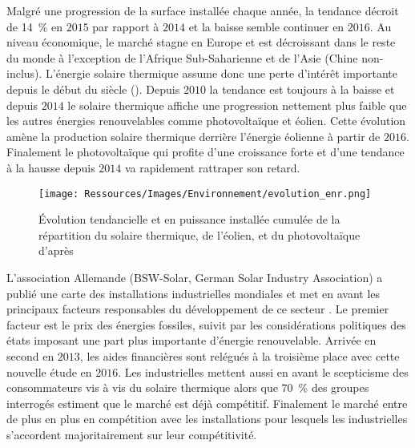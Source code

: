 Malgré une progression de la surface installée chaque année, la tendance décroit
de \SI{14}{\percent} en $2015$ par rapport à $2014$ et la baisse semble continuer en
$2016$. Au niveau économique, le marché stagne en Europe et est décroissant dans le reste
du monde à l’exception de l’Afrique Sub-Saharienne et de l’Asie (Chine non-inclus).
L’énergie solaire thermique assume donc une perte d’intérêt importante depuis le début du siècle
(). Depuis $2010$ la tendance est toujours à la baisse
et depuis $2014$ le solaire thermique affiche une progression nettement plus faible
que les autres énergies renouvelables comme photovoltaïque et éolien. Cette évolution
amène la production solaire thermique derrière l’énergie éolienne à partir de $2016$. Finalement
le photovoltaïque qui profite d’une croissance forte et d’une tendance à la hausse depuis $2014$
va rapidement rattraper son retard.

\begin{figure}
    \centering
    \texttt{[image: Ressources/Images/Environnement/evolution\_enr.png]}
    \caption{Évolution tendancielle et en puissance installée cumulée de la répartition
             du solaire thermique, de l’éolien, et du photovoltaïque d’après
             \textcite{Weiss2017}}
    \label{fig:tendances_enr}
\end{figure}

L’association Allemande (\textsf{BSW-Solar}, German Solar Industry Association)
a publié une carte des installations industrielles mondiales et met en avant les
principaux facteurs responsables du développement de ce secteur \parencite{Augsten2017}.
Le premier facteur est le prix des énergies fossiles, suivit par les considérations
politiques des états imposant une part plus importante d’énergie renouvelable. Arrivée
en second en $2013$, les aides financières sont relégués à la troisième place avec
cette nouvelle étude en $2016$. Les industrielles
mettent aussi en avant le scepticisme des consommateurs vis à vis du solaire thermique
alors que \SI{70}{\percent} des groupes interrogés estiment que le marché est déjà
compétitif. Finalement le marché entre de plus en plus en compétition avec les installations  pour
lesquels les industrielles s’accordent majoritairement sur leur compétitivité.


